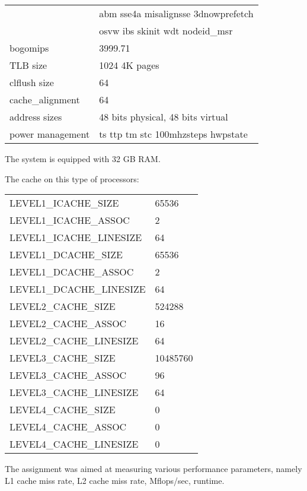 \documentclass[utf8,12pt]{report}
\begin{document}
\begin{table}
\begin{tabular}{|l|l|}
		                & abm sse4a misalignsse 3dnowprefetch \\
		                & osvw ibs skinit wdt nodeid\_msr \\
		bogomips        & 3999.71 \\
		TLB size        & 1024 4K pages \\
		clflush size    & 64 \\
		cache\_alignment & 64 \\
		address sizes    & 48 bits physical, 48 bits virtual \\
		power management & ts ttp tm stc 100mhzsteps hwpstate \\
		\hline
	\end{tabular}
\end{table}


The system is equipped with 32 GB RAM.

The cache on this type of processors:

\begin{table}
	\begin{tabular}{|l|l|}
	\hline
		LEVEL1\_ICACHE\_SIZE                 & 65536 \\
		LEVEL1\_ICACHE\_ASSOC                & 2 \\
		LEVEL1\_ICACHE\_LINESIZE             & 64 \\
		LEVEL1\_DCACHE\_SIZE                 & 65536 \\
		LEVEL1\_DCACHE\_ASSOC                & 2 \\
		LEVEL1\_DCACHE\_LINESIZE             & 64 \\
		LEVEL2\_CACHE\_SIZE                  & 524288 \\
		LEVEL2\_CACHE\_ASSOC                 & 16 \\
		LEVEL2\_CACHE\_LINESIZE              & 64 \\
		LEVEL3\_CACHE\_SIZE                  & 10485760 \\
		LEVEL3\_CACHE\_ASSOC                 & 96 \\
		LEVEL3\_CACHE\_LINESIZE              & 64 \\
		LEVEL4\_CACHE\_SIZE                  & 0 \\
		LEVEL4\_CACHE\_ASSOC                 & 0 \\
		LEVEL4\_CACHE\_LINESIZE              & 0 \\
	\hline
	\end{tabular}
\end{table}


The assignment was aimed at measuring various performance parameters, namely L1 cache miss rate, L2 cache miss rate, Mflops/sec, runtime.
\end{document}
